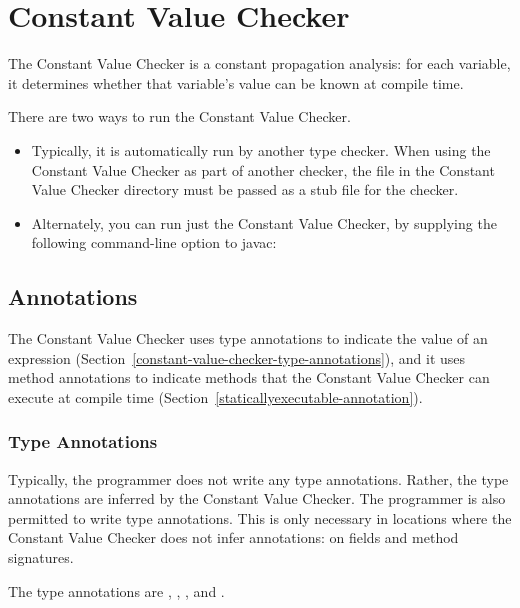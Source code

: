 \htmlhr
\chapter{Constant Value Checker\label{constant-value-checker}}

The Constant Value Checker is a constant propagation analysis: for
each variable, it determines whether that variable's value can be
known at compile time.

There are two ways to run the Constant Value Checker.
\begin{itemize}
\item
Typically, it is automatically run by another type checker.
When using the Constant Value Checker as part of another checker, the
 file in the Constant Value Checker directory must
be passed as a stub file for the checker.
\item
Alternately, you can run just the Constant Value Checker, by
supplying the following command-line option to javac:
\end{itemize}

\section{Annotations\label{constant-value-checker-annotations}}

The Constant Value Checker uses type annotations to indicate the value of
an expression (Section~\ref{constant-value-checker-type-annotations}), and
it uses method annotations to indicate methods that the Constant Value
Checker can execute at compile time
(Section~\ref{staticallyexecutable-annotation}).


\subsection{Type Annotations\label{constant-value-checker-type-annotations}}

Typically, the programmer does not write any type annotations.  Rather, the
type annotations are inferred by the Constant Value Checker.
The programmer is also permitted to write type annotations.  This is only necessary in
locations where the Constant Value Checker does not infer annotations:  on fields
and method signatures.

The type annotations are
,
,
, and
.

